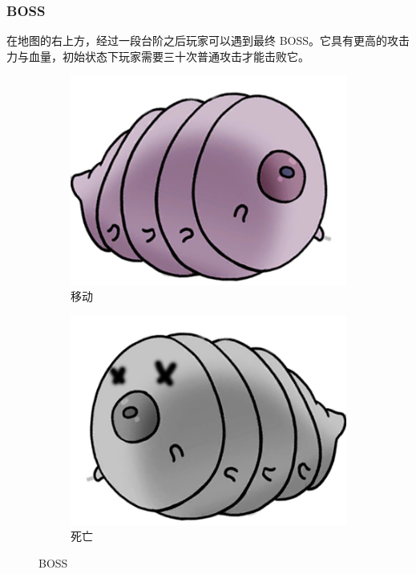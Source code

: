\documentclass[12pt, twoside, a4paper]{article}
\begin{document}
\subsubsection{BOSS}

在地图的右上方，经过一段台阶之后玩家可以遇到最终 BOSS。它具有更高的攻击力与血量，初始状态下玩家需要三十次普通攻击才能击败它。

\begin{figure}[h!]
    \centering
    \begin{subfigure}{0.4\textwidth}
        \includegraphics[width=\textwidth]{assets/report/boss_move0.png}
        \caption{移动}
    \end{subfigure}
    \hspace{0.05\textwidth}
    \begin{subfigure}{0.4\textwidth}
        \includegraphics[width=\textwidth]{assets/report/boss_death.png}
        \caption{死亡}
    \end{subfigure}
    \caption{BOSS}
\end{figure}
\end{document}
